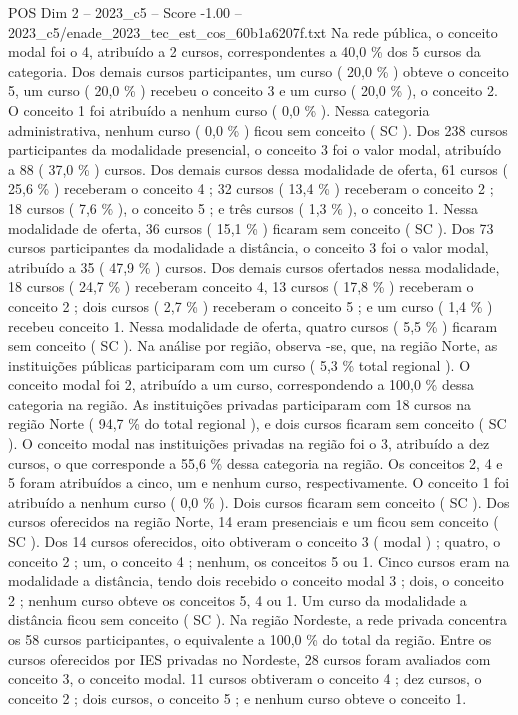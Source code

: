 \begin{textsample}{POS Dim 2 – 2023\_c5 – Score -1.00 – 2023\_c5/enade\_2023\_tec\_est\_cos\_60b1a6207f.txt}
Na rede pública, o conceito modal foi o 4, atribuído a 2 cursos, correspondentes a 40,0 \% dos 5 cursos da categoria.
Dos demais cursos participantes, um curso ( 20,0 \% ) obteve o conceito 5, um curso ( 20,0 \% ) recebeu o conceito 3 e um curso ( 20,0 \% ), o conceito 2.
O conceito 1 foi atribuído a nenhum curso ( 0,0 \% ).
Nessa categoria administrativa, nenhum curso ( 0,0 \% ) ficou sem conceito ( SC ).
Dos 238 cursos participantes da modalidade presencial, o conceito 3 foi o valor modal, atribuído a 88 ( 37,0 \% ) cursos.
Dos demais cursos dessa modalidade de oferta, 61 cursos ( 25,6 \% ) receberam o conceito 4 ; 32 cursos ( 13,4 \% ) receberam o conceito 2 ; 18 cursos ( 7,6 \% ), o conceito 5 ; e três cursos ( 1,3 \% ), o conceito 1.
Nessa modalidade de oferta, 36 cursos ( 15,1 \% ) ficaram sem conceito ( SC ).
Dos 73 cursos participantes da modalidade a distância, o conceito 3 foi o valor modal, atribuído a 35 ( 47,9 \% ) cursos.
Dos demais cursos ofertados nessa modalidade, 18 cursos ( 24,7 \% ) receberam conceito 4, 13 cursos ( 17,8 \% ) receberam o conceito 2 ; dois cursos ( 2,7 \% ) receberam o conceito 5 ; e um curso ( 1,4 \% ) recebeu conceito 1.
Nessa modalidade de oferta, quatro cursos ( 5,5 \% ) ficaram sem conceito ( SC ).
Na análise por região, observa -se, que, na região Norte, as instituições públicas participaram com um curso ( 5,3 \% total regional ).
O conceito modal foi 2, atribuído a um curso, correspondendo a 100,0 \% dessa categoria na região.
As instituições privadas participaram com 18 cursos na região Norte ( 94,7 \% do total regional ), e dois cursos ficaram sem conceito ( SC ).
O conceito modal nas instituições privadas na região foi o 3, atribuído a dez cursos, o que corresponde a 55,6 \% dessa categoria na região.
Os conceitos 2, 4 e 5 foram atribuídos a cinco, um e nenhum curso, respectivamente.
O conceito 1 foi atribuído a nenhum curso ( 0,0 \% ).
Dois cursos ficaram sem conceito ( SC ).
Dos cursos oferecidos na região Norte, 14 eram presenciais e um ficou sem conceito ( SC ).
Dos 14 cursos oferecidos, oito obtiveram o conceito 3 ( modal ) ; quatro, o conceito 2 ; um, o conceito 4 ; nenhum, os conceitos 5 ou 1.
Cinco cursos eram na modalidade a distância, tendo dois recebido o conceito modal 3 ; dois, o conceito 2 ; nenhum curso obteve os conceitos 5, 4 ou 1.
Um curso da modalidade a distância ficou sem conceito ( SC ).
Na região Nordeste, a rede privada concentra os 58 cursos participantes, o equivalente a 100,0 \% do total da região.
Entre os cursos oferecidos por IES privadas no Nordeste, 28 cursos foram avaliados com conceito 3, o conceito modal. 11 cursos obtiveram o conceito 4 ; dez cursos, o conceito 2 ; dois cursos, o conceito 5 ; e nenhum curso obteve o conceito 1.

\end{textsample}
